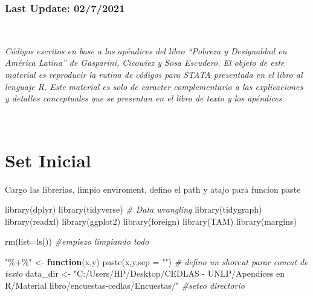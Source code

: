 \documentclass[
]{book}
\newenvironment{Shaded}{\begin{snugshade}}{\end{snugshade}}
\newcommand{\AttributeTok}[1]{\textcolor[rgb]{0.77,0.63,0.00}{#1}}
\newcommand{\CommentTok}[1]{\textcolor[rgb]{0.56,0.35,0.01}{\textit{#1}}}
\newcommand{\ControlFlowTok}[1]{\textcolor[rgb]{0.13,0.29,0.53}{\textbf{#1}}}
\newcommand{\FunctionTok}[1]{\textcolor[rgb]{0.00,0.00,0.00}{#1}}
\newcommand{\NormalTok}[1]{#1}
\newcommand{\OtherTok}[1]{\textcolor[rgb]{0.56,0.35,0.01}{#1}}
\newcommand{\StringTok}[1]{\textcolor[rgb]{0.31,0.60,0.02}{#1}}
\begin{document}
\hypertarget{last-update-0272021-1}{%
\subsubsection*{Last Update: 02/7/2021}\label{last-update-0272021-1}}

~

\emph{Códigos escritos en base a los apéndices del libro ``Pobreza y Desigualdad en América Latina'' de Gasparini, Cicowiez y Sosa Escudero. El objeto de este material es reproducir la rutina de códigos para STATA presentada en el libro al lenguaje R. Este material es solo de caracter complementario a las explicaciones y detalles conceptuales que se presentan en el libro de texto y los apéndices}

~

\hypertarget{set-inicial-2}{%
\section{Set Inicial}\label{set-inicial-2}}

Cargo las librerias, limpio enviroment, defino el path y atajo para funcion paste

\begin{Shaded}
\begin{Highlighting}[]
\FunctionTok{library}\NormalTok{(dplyr)}
\FunctionTok{library}\NormalTok{(tidyverse) }\CommentTok{\# Data wrangling}
\FunctionTok{library}\NormalTok{(tidygraph)}
\FunctionTok{library}\NormalTok{(readxl)}
\FunctionTok{library}\NormalTok{(ggplot2)}
\FunctionTok{library}\NormalTok{(foreign)}
\FunctionTok{library}\NormalTok{(TAM)}
\FunctionTok{library}\NormalTok{(margins)}

\FunctionTok{rm}\NormalTok{(}\AttributeTok{list=}\FunctionTok{ls}\NormalTok{())    }\CommentTok{\#empiezo limpiando todo }

\StringTok{"\%+\%"} \OtherTok{\textless{}{-}} \ControlFlowTok{function}\NormalTok{(x,y) }\FunctionTok{paste}\NormalTok{(x,y,}\AttributeTok{sep =} \StringTok{""}\NormalTok{)      }\CommentTok{\# defino un shorcut parar concat de texto}
\NormalTok{data\_dir }\OtherTok{\textless{}{-}} \StringTok{"C:/Users/HP/Desktop/CEDLAS {-} UNLP/Apendices en R/Material libro/encuestas{-}cedlas/Encuestas/"}  \CommentTok{\#seteo directorio }
\end{Highlighting}
\end{Shaded}

~
\end{document}
